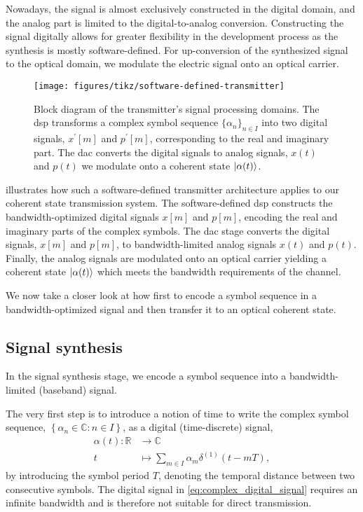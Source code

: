 Nowadays, the signal is almost exclusively constructed in the digital domain, and the analog part is limited to the digital-to-analog conversion.
Constructing the signal digitally allows for greater flexibility in the development process as the synthesis is mostly software-defined.
For up-conversion of the synthesized signal to the optical domain, we modulate the electric signal onto an optical carrier.
\begin{figure}[htb]
	\centering
	\texttt{[image: figures/tikz/software-defined-transmitter]}
	\caption{Block diagram of the transmitter's signal processing domains. The \gls{dsp} transforms a complex symbol sequence $\{\alpha_n\}_{n\in I}$ into two digital signals, $x^\prime[m]$ and $p^\prime[m]$, corresponding to the real and imaginary part. The \gls{dac} converts the digital signals to analog signals, $x(t)$ and $p(t)$ we modulate onto a coherent state $\lvert\alpha(t)\rangle$.}\label{fig:software_defined_transmitter}
\end{figure}
 illustrates how such a software-defined transmitter architecture applies to our coherent state transmission system.
The software-defined \gls{dsp} constructs the bandwidth-optimized digital signals $x[m]$ and $p[m]$, encoding the real and imaginary parts of the complex symbols.
The \gls{dac} stage converts the digital signals, $x[m]$ and $p[m]$, to bandwidth-limited analog signals $x(t)$ and $p(t)$.
Finally, the analog signals are modulated onto an optical carrier yielding a coherent state $\lvert\alpha(t)\rangle$ which meets the bandwidth requirements of the channel.

We now take a closer look at how first to encode a symbol sequence in a bandwidth-optimized signal and then transfer it to an optical coherent state.

\subsection{Signal synthesis}

In the signal synthesis stage, we encode a symbol sequence into a bandwidth-limited (baseband) signal.

The very first step is to introduce a notion of time to write the complex symbol sequence, $\left\{\alpha_n\in\mathbb{C}\colon n\in I\right\}$, as a digital (time-discrete) signal,
\begin{equation}
	\begin{split}
		\alpha(t)
		\colon
		\mathbb{R}
		&
		\to
		\mathbb{C}
		\\
		t
		&\mapsto
		\sum_{m\in I}
		\alpha_m
		\delta^{(1)}(t-mT)
		,
	\end{split}
	\label{eq:complex_digital_signal}
\end{equation}
by introducing the symbol period $T$, denoting the temporal distance between two consecutive symbols.
The digital signal in \cref{eq:complex_digital_signal} requires an infinite bandwidth and is therefore not suitable for direct transmission.


